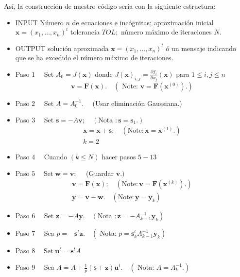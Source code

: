 	Así, la construcción de nuestro código sería con la siguiente estructura:
\begin{itemize}
\item INPUT Número $n$ de ecuaciones e incógnitas; aproximación inicial $\mathbf{x}=\left(x_{1}, \ldots, x_{n}\right)^{t}$ tolerancia $T O L ;$ número máximo de iteraciones $N .$
\item OUTPUT solución aproximada $\mathbf{x}=\left(x_{1}, \ldots, x_{n}\right)^{t}$ ó un mensaje indicando que se ha excedido el número máximo de iteraciones.
\item Paso $1 \quad$ Set $A_{0}=J(\mathbf{x})$ donde $J(\mathbf{x})_{i, j}=\frac{\partial f_{i}}{\partial x_{j}}(\mathbf{x})$ para $1 \leq i, j \leq n$
$$
\mathbf{v}=\mathbf{F}(\mathbf{x}) . \quad\left(\text { Note: } \mathbf{v}=\mathbf{F}\left(\mathbf{x}^{(0)}\right) .\right)
$$
\item Paso 2$\quad$ Set $A=A_{0}^{-1} . \quad$ (Usar eliminación Gaussiana.)
\item Paso $3 \quad$ Set $\mathbf{s}=-A \mathbf{v} ; \quad\left(\right.$Nota $\left.: \mathbf{s}=\mathbf{s}_{1} .\right)$
$$
\begin{array}{l}
	\mathbf{x}=\mathbf{x}+\mathbf{s} ; \quad\left(\text {Note}: \mathbf{x}=\mathbf{x}^{(1)} .\right) \\
	k=2
\end{array}
$$
\item Paso $4 \quad$ Cuando $(k \leq N)$ hacer pasos $5-13$
\item Paso $5 \quad \operatorname{Set} \mathbf{w}=\mathbf{v} ; \quad$ (Guardar $\mathbf{v} .)$
$$
\begin{array}{l}
	\mathbf{v}=\mathbf{F}(\mathbf{x}) ; \quad\left(\text {Note}: \mathbf{v}=\mathbf{F}\left(\mathbf{x}^{(k)}\right) .\right) \\
	\mathbf{y}=\mathbf{v}-\mathbf{w} . \quad\left(\text {Note}: \mathbf{y}=\mathbf{y}_{k}\right)
\end{array}
$$
\item Paso $6 \quad$ Set $\mathbf{z}=-A \mathbf{y} . \quad\left(\right.$Nota $\left.: \mathbf{z}=-A_{k-1}^{-1} \mathbf{y}_{k}\right)$
\item Paso $7 \quad$ Sea $p=-\mathbf{s}^{t} \mathbf{z} . \quad\left(\right.$ Nota: $\left.p=\mathbf{s}_{k}^{t} A_{k-1}^{-1} \mathbf{y}_{k}\right)$
\item Paso $8 \quad \operatorname{Set} \mathbf{u}^{t}=\mathbf{s}^{t} A$\\
\item Paso $9 \quad$ Sea $A=A+\frac{1}{p}(\mathbf{s}+\mathbf{z}) \mathbf{u}^{t} . \quad\left(\right.$ Nota: $\left.A=A_{k}^{-1} .\right)$\\

\end{itemize}
